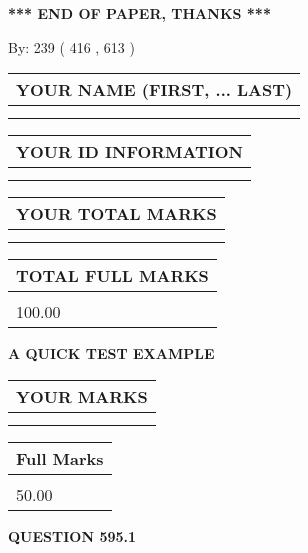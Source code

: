 \documentclass[12pt]{article}
\begin{document}
\vspace{1.0in} 
{\textbf{\large{ *** END OF PAPER, THANKS *** }}} 
   
   
\hspace{1.0in} By: 
 239 ( 416 ,  613 )
   
   
   
   
\newpage 
\setcounter{page}{ 
   595001 } 
   
   
   
   
\noindent\begin{tabular}{|l|}
\hline
YOUR NAME (FIRST, ... LAST)  \\
\hline
 \\ 
 \\ 
\hline
\end{tabular}
\hspace{0.05in} \begin{tabular}{|l|}
\hline
 YOUR   ID   INFORMATION  \\
\hline
 \\ 
 \\ 
\hline
\end{tabular}
   
   
\vspace{0.2in}\noindent\begin{tabular}{|l|}
\hline
YOUR TOTAL MARKS  \\
\hline
 \\ 
 \\ 
\hline
\end{tabular}
\hspace{0.05in} \begin{tabular}{|l|}
\hline
TOTAL FULL MARKS  \\
\hline
 \\ 
100.00 \\
\hline
\end{tabular}
   
   
 \vspace{0.2in}
{\LARGE {\textbf{ A QUICK TEST EXAMPLE}}}
   
   
  
\vspace{0.2in}
  
\noindent\begin{tabular}{|l|}
\hline
 YOUR MARKS  \\
\hline
 \\ 
 \\ 
\hline
\end{tabular}
\hspace{0.05in} \begin{tabular}{|l|}
\hline
 Full Marks  \\
\hline
 \\ 
50.00 \\
\hline
\end{tabular}
{\textbf{\Large{QUESTION
595.1 
}}}
  
\end{document}

